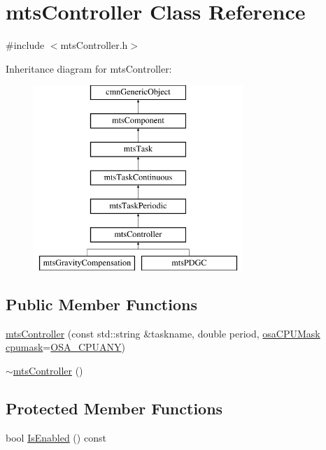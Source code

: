 \hypertarget{classmts_controller}{}\section{mts\+Controller Class Reference}
\label{classmts_controller}


{\ttfamily \#include $<$mts\+Controller.\+h$>$}

Inheritance diagram for mts\+Controller\+:\begin{figure}[H]
\begin{center}
\leavevmode
\includegraphics[height=7.000000cm]{dd/dc4/classmts_controller}
\end{center}
\end{figure}
\subsection*{Public Member Functions}
\begin{DoxyCompactItemize}
\item 
\hyperlink{classmts_controller_aa638cb1283a8dbaf3542b573674b36a2}{mts\+Controller} (const std\+::string \&taskname, double period, \hyperlink{osa_c_p_u_affinity_8h_aaec7cdd7797e5e6eb5438c15fee5477a}{osa\+C\+P\+U\+Mask} \hyperlink{classmts_controller_a3125e5e9b65dc2347725215e8af73c9f}{cpumask}=\hyperlink{osa_c_p_u_affinity_8h_a2ae5ea257830cff2814d81ce526ada35}{O\+S\+A\+\_\+\+C\+P\+U\+A\+N\+Y})
\item 
\hyperlink{classmts_controller_a84a7764b11c648574c20bb40d00f6e0f}{$\sim$mts\+Controller} ()
\end{DoxyCompactItemize}
\subsection*{Protected Member Functions}
\begin{DoxyCompactItemize}
\item 
bool \hyperlink{classmts_controller_a487a7255506237f1138c9518017fa989}{Is\+Enabled} () const 
\end{DoxyCompactItemize}
